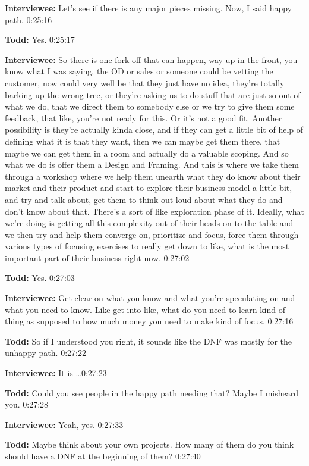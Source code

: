 \textbf{Interviewee:}  	Let's see if there is any major pieces missing.  Now, I said happy path.  0:25:16

\textbf{Todd:}  	Yes.  0:25:17

\textbf{Interviewee:} 	So there is one fork off that can happen, way up in the front, you know what I was saying, the OD or sales or someone could be vetting the customer, now could very well be that they just have no idea, they're totally barking up the wrong tree, or they're asking us to do stuff that are just so out of what we do, that we direct them to somebody else or we try to give them some feedback, that like, you're not ready for this.  Or it's not a good fit.  Another possibility is they're actually kinda close, and if they can get a little bit of help of defining what it is that they want, then we can maybe get them there, that maybe we can get them in a room and actually do a valuable scoping.   And so what we do is offer them a Design and Framing.  And this is where we take them through a workshop where we help them unearth what they do know about their market and their product and start to explore their business model a little bit, and try and talk about, get them to think out loud about what they do and don't know about that. There's a sort of like exploration phase of it.  Ideally, what we're doing is getting all this complexity out of their heads on to the table and we then try and help them converge on, prioritize and focus, force them through various types of focusing exercises to really get down to like, what is the most important part of their business right now.  0:27:02

\textbf{Todd:}   Yes.  0:27:03

\textbf{Interviewee:}  	Get clear on what you know and what you're speculating on and what you need to know.  Like get into like, what do you need to learn kind of thing as supposed to how much money you need to make kind of focus.  0:27:16

\textbf{Todd:}  	So if I understood you right, it sounds like the DNF was mostly for the unhappy path.   0:27:22

\textbf{Interviewee:}  	It is \ldots  0:27:23

\textbf{Todd:}  	Could you see people in the happy path needing that?  Maybe I misheard you.  0:27:28

\textbf{Interviewee:}  	Yeah, yes.  0:27:33

\textbf{Todd:} 	Maybe think about your own projects.  How many of them do you think should have a DNF at the beginning of them?  0:27:40

